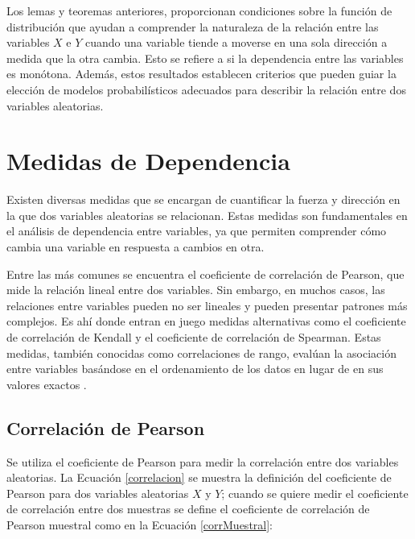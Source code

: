 Los lemas y teoremas anteriores, proporcionan condiciones sobre la función de distribución que ayudan a comprender la naturaleza de la relación entre las variables $X$ e $Y$ cuando una variable tiende a moverse en una sola dirección a medida que la otra cambia. Esto se refiere a si la dependencia entre las variables es monótona. Además, estos resultados establecen criterios que pueden guiar la elección de modelos probabilísticos adecuados para describir la relación entre dos variables aleatorias.

\section{Medidas de Dependencia}

Existen diversas medidas que se encargan de cuantificar la fuerza y dirección en la que dos variables aleatorias se relacionan. Estas medidas son fundamentales en el análisis de dependencia entre variables, ya que permiten comprender cómo cambia una variable en respuesta a cambios en otra. 

Entre las más comunes se encuentra el coeficiente de correlación de Pearson, que mide la relación lineal entre dos variables. Sin embargo, en muchos casos, las relaciones entre variables pueden no ser lineales y pueden presentar patrones más complejos. Es ahí donde entran en juego medidas alternativas como el coeficiente de correlación de Kendall y el coeficiente de correlación de Spearman. Estas medidas, también conocidas como correlaciones de rango, evalúan la asociación entre variables basándose en el ordenamiento de los datos en lugar de en sus valores exactos \cite{czadoAnalyzing}.



\subsection{Correlación de Pearson}

Se utiliza el coeficiente de Pearson para medir la correlación entre dos variables aleatorias. La Ecuación \eqref{correlacion} se muestra la definición del coeficiente de Pearson para dos variables aleatorias $X$ y $Y$; cuando se quiere medir el coeficiente de correlación entre dos muestras se define el coeficiente de correlación de Pearson muestral como en la Ecuación \eqref{corrMuestral}:


